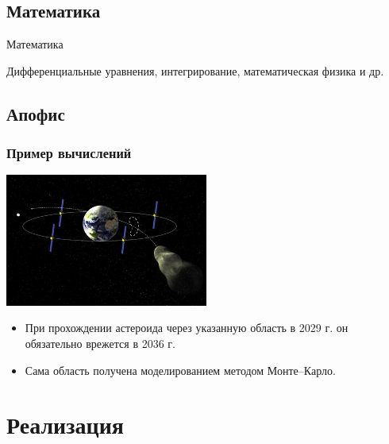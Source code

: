 \documentclass[compress,red]{beamer}
\begin{document}
\subsection{Математика}
\begin{frame}
  \begin{center}
    \Huge{Математика}
  \end{center}
  \begin{center}
    \Large{Дифференциальные уравнения, интегрирование, математическая физика и др.}
  \end{center}
\end{frame}

\subsection{Апофис}
\begin{frame}[fragile]
  \frametitle{Пример вычислений}
  
  \centerline{\includegraphics[width=0.5\textwidth]{images/apophis.jpg}}
  \begin{itemize}
    \item При прохождении астероида через указанную область в 2029 г. он обязательно врежется в 2036 г. 
    \item Сама область получена моделированием методом Монте--Карло.
  \end{itemize}
  
\end{frame}

\section{Реализация}
\end{document}
